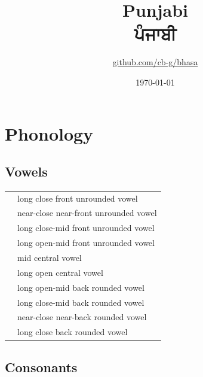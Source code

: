 \documentclass{article}
\title{Punjabi\\{\gurmukhifont ਪੰਜਾਬੀ}\\\ipa{[p@\textltailn"\t{\textdyoghlig}a\u{b}.bi]}}
\author{\href{https://github.com/cb-g/bhasa}{github.com/cb-g/bhasa}}
\date{\today}
\begin{document}
\pagecolor{custom_bg}\color{custom_fg}
\maketitle\thispagestyle{empty}

\newpage\setcounter{page}{1}\section{Phonology}

\subsection{Vowels}

\begin{xltabular}{\textwidth}{lL}
   & long close front unrounded vowel \\
   & near-close near-front unrounded vowel \\
   & long close-mid front unrounded vowel \\
   & long open-mid front unrounded vowel \\
   & mid central vowel \\
   & long open central vowel \\
   & long open-mid back rounded vowel \\
   & long close-mid back rounded vowel \\
   & near-close near-back rounded vowel \\
   & long close back rounded vowel \\
\end{xltabular}

\subsection{Consonants}
\end{document}
